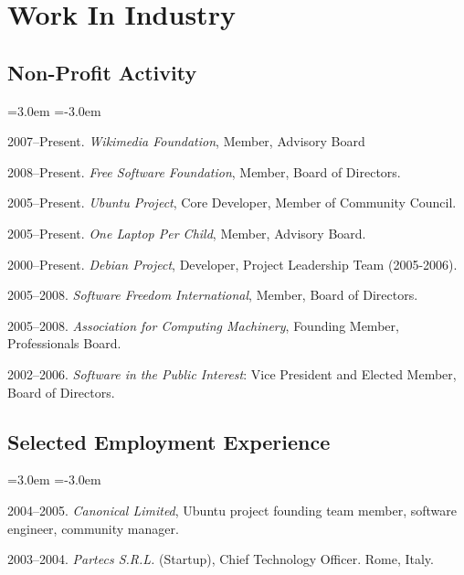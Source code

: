 \documentclass[11pt]{article}
\newenvironment{cvlist}{
\begin{list}{}{\leftmargin=3.0em \itemindent=-3.0em}
  \setlength{\itemsep}{0pt}
  \setlength{\parskip}{0em}
  \setlength{\parsep}{1em}
  \setlength{\parindent}{0em}}
{\vspace{1em}
\end{list}}
\begin{document}
\section{Work In Industry}

\subsection{Non-Profit Activity}
\begin{cvlist}
\item 2007--Present. \emph{Wikimedia Foundation}, Member, Advisory Board
\item 2008--Present. \emph{Free Software Foundation}, Member, Board of Directors.
\item 2005--Present. \emph{Ubuntu Project}, Core Developer, Member of Community Council.
\item 2005--Present. \emph{One Laptop Per Child}, Member, Advisory Board.
\item 2000--Present. \emph{Debian Project}, Developer, Project Leadership Team (2005-2006).
\item 2005--2008. \emph{Software Freedom International}, Member, Board of Directors.
\item 2005--2008. \emph{Association for Computing Machinery}, Founding Member, Professionals Board.
\item 2002--2006. \emph{Software in the Public Interest}: Vice President and Elected Member, Board of Directors.
\end{cvlist}

\subsection{Selected Employment Experience}
\begin{cvlist}
\item 2004--2005. \emph{Canonical Limited}, Ubuntu project founding team
  member, software engineer, community manager.
\item 2003--2004. \emph{Partecs S.R.L.} (Startup), Chief Technology
  Officer. Rome, Italy.
\end{cvlist}
\end{document}
